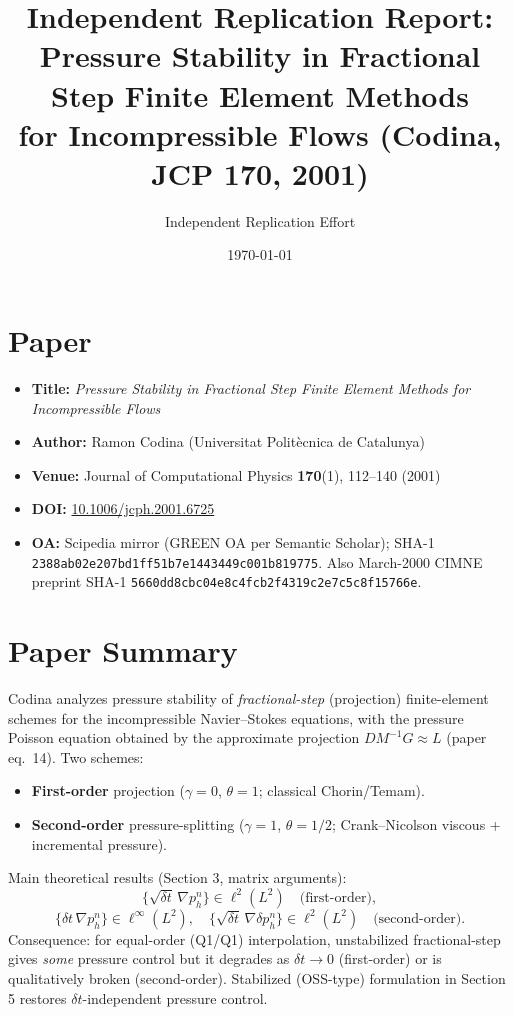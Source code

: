\documentclass[11pt]{article}
\title{Independent Replication Report:\\
Pressure Stability in Fractional Step Finite Element Methods\\
for Incompressible Flows (Codina, JCP 170, 2001)}
\author{Independent Replication Effort}
\date{\today}
\begin{document}
\maketitle

\section{Paper}
\begin{itemize}
  \item \textbf{Title:} \emph{Pressure Stability in Fractional Step Finite Element Methods for Incompressible Flows}
  \item \textbf{Author:} Ramon Codina (Universitat Polit\`ecnica de Catalunya)
  \item \textbf{Venue:} Journal of Computational Physics \textbf{170}(1), 112--140 (2001)
  \item \textbf{DOI:} \href{https://doi.org/10.1006/jcph.2001.6725}{10.1006/jcph.2001.6725}
  \item \textbf{OA:} Scipedia mirror (GREEN OA per Semantic Scholar);
        SHA-1 \texttt{2388ab02e207bd1ff51b7e1443449c001b819775}. Also March-2000 CIMNE
        preprint SHA-1 \texttt{5660dd8cbc04e8c4fcb2f4319c2e7c5c8f15766e}.
\end{itemize}

\section{Paper Summary}
Codina analyzes pressure stability of \emph{fractional-step} (projection)
finite-element schemes for the incompressible Navier--Stokes equations, with the
pressure Poisson equation obtained by the approximate projection
$D M^{-1} G \approx L$ (paper eq.~14). Two schemes:
\begin{itemize}
  \item \textbf{First-order} projection ($\gamma=0$, $\theta=1$; classical Chorin/Temam).
  \item \textbf{Second-order} pressure-splitting ($\gamma=1$, $\theta=1/2$; Crank--Nicolson
        viscous + incremental pressure).
\end{itemize}
Main theoretical results (Section 3, matrix arguments):
\[
  \{\sqrt{\delta t}\,\nabla p_h^n\} \in \ell^2(L^2) \quad \text{(first-order)},
\]
\[
  \{\delta t\,\nabla p_h^n\} \in \ell^\infty(L^2),\quad
  \{\sqrt{\delta t}\,\nabla \delta p_h^n\} \in \ell^2(L^2) \quad \text{(second-order)}.
\]
Consequence: for equal-order (Q1/Q1) interpolation, unstabilized fractional-step
gives \emph{some} pressure control but it degrades as $\delta t \to 0$ (first-order)
or is qualitatively broken (second-order). Stabilized (OSS-type) formulation in
Section 5 restores $\delta t$-independent pressure control.
\end{document}
